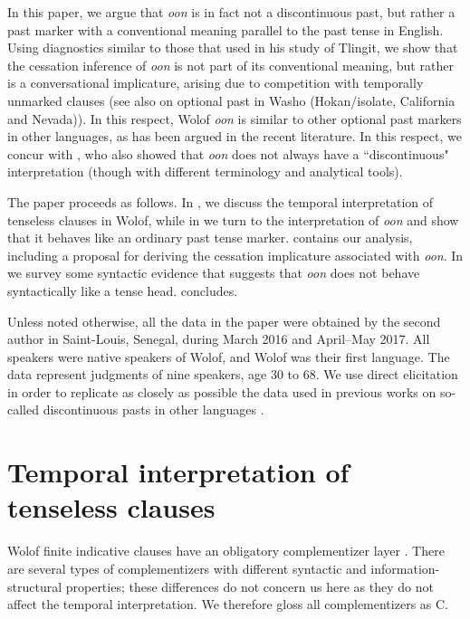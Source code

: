 \documentclass[output=paper,newtxmath,modfonts,nonflat,draftmode]{langsci/langscibook}
\begin{document}
In this paper, we argue that \textit{oon} is in fact not a discontinuous past, but rather a past marker with a conventional meaning parallel to the past tense in English. Using diagnostics similar to those that \citet{Cable2017a} used in his study of Tlingit, we show that the cessation inference of \textit{oon} is not part of its conventional meaning, but rather is a conversational implicature, arising due to competition with temporally unmarked clauses (see also \citealt{bochnak16past} on optional past in Washo (Hokan/isolate, California and Nevada)). In this respect, Wolof \textit{oon} is similar to other optional past markers in other languages, as has been argued in the recent literature. In this respect, we concur with \citet{church81systeme}, who also showed that \textit{oon} does not always have a ``discontinuous" interpretation (though with different terminology and analytical tools). %
 
The paper proceeds as follows. In , we discuss the temporal
interpretation of tenseless clauses in Wolof, while in  we
turn to the interpretation of \textit{oon} and show that it behaves
like an ordinary past tense marker.  contains our analysis, including a proposal for
deriving the cessation implicature associated with \textit{oon}. In
 we survey some syntactic evidence that suggests that
\textit{oon} does not behave syntactically like a tense head.  concludes.

Unless noted otherwise, all the data in the paper were obtained by the
second author in Saint-Louis, Senegal, during March 2016 and
April--May 2017. All speakers were native speakers of Wolof, and Wolof
was their first language. The data represent judgments of nine speakers,
age 30 to 68.  We use direct elicitation in order to replicate as closely as possible the data used in previous works on so-called discontinuous pasts in other languages \citep{bochnak16past, Cable2017a}.


\section{Temporal interpretation of tenseless clauses}\label{sec:bochnak:2}

Wolof finite indicative clauses have an obligatory complementizer
layer \citep{Martinovic2015b}. There are several types of
complementizers with different syntactic and information-structural
properties; these differences do not concern us here as they do not
affect the temporal interpretation. We therefore gloss all
complementizers as C.
\end{document}
